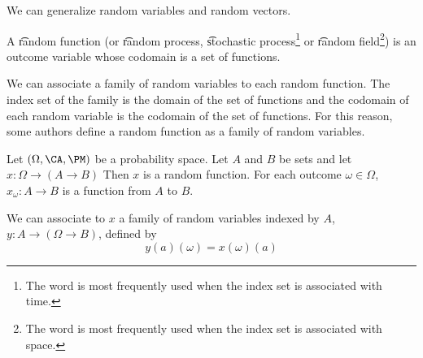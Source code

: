 

We can generalize random variables and random vectors.


A \t{random function} (or \t{random process}, \t{stochastic process}\footnote{The word  is most frequently used when the index set is associated with time.} or \t{random field}\footnote{The word  is most frequently used when the index set is associated with space.}) is an outcome variable whose codomain is a set of functions.

We can associate a family of random variables to each random function.
The index set of the family is the domain of the set of functions and the codomain of each random variable is the codomain of the set of functions.
For this reason, some authors define a random function as a family of random variables.


Let $(\Omega, \CA, \PM)$ be a probability space.
Let $A$ and $B$ be sets and let $x: \Omega \to (A \to B)$
Then $x$ is a random function.
For each outcome $\omega \in \Omega$, $x_{\omega}: A \to B$ is a function from $A$ to $B$.

We can associate to $x$ a family of random variables indexed by $A$, $y: A \to (\Omega \to B)$, defined by
\[
  y(a)(\omega) = x(\omega)(a)
\]



\blankpage
